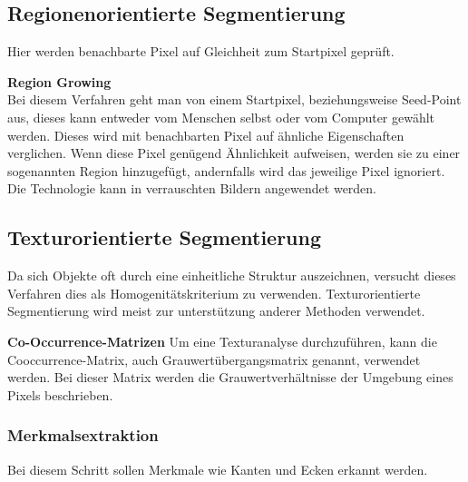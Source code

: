     \subsection*{Regionenorientierte Segmentierung}
    Hier werden benachbarte Pixel\cite{Seg_region} auf Gleichheit zum Startpixel geprüft.

    \textbf{Region Growing}\\
    Bei diesem Verfahren geht man von einem Startpixel, beziehungsweise Seed-Point aus, dieses kann entweder vom Menschen selbst oder vom Computer gewählt werden. Dieses wird mit benachbarten Pixel auf ähnliche Eigenschaften verglichen. Wenn diese Pixel genügend Ähnlichkeit aufweisen, werden sie zu einer sogenannten Region hinzugefügt, andernfalls wird das jeweilige Pixel ignoriert. Die Technologie kann in verrauschten Bildern angewendet werden.

    \subsection*{Texturorientierte Segmentierung}
    Da sich Objekte oft durch eine einheitliche Struktur auszeichnen, versucht dieses Verfahren dies als Homogenitätskriterium zu verwenden. Texturorientierte Segmentierung\cite{Seg_textur} wird meist zur unterstützung anderer Methoden verwendet. 

    \textbf{Co-Occurrence-Matrizen}
    Um eine Texturanalyse durchzuführen, kann die Cooccurrence-Matrix\cite{seg_coocc}, auch Grauwertübergangsmatrix genannt, verwendet werden. 
    Bei dieser Matrix werden die Grauwertverhältnisse der Umgebung eines Pixels beschrieben.

    \subsubsection{Merkmalsextraktion}
    Bei diesem Schritt sollen Merkmale wie Kanten und Ecken erkannt werden.

